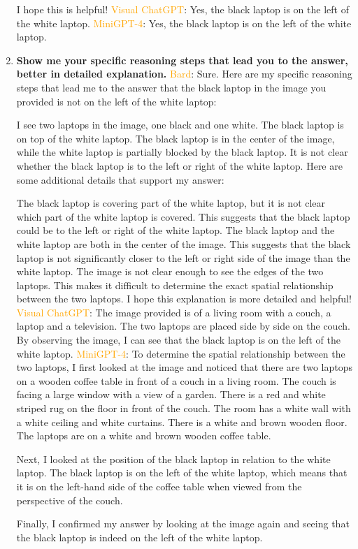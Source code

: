 \begin{enumerate}
    I hope this is helpful!
    \subitem \textcolor{orange}{Visual ChatGPT}: Yes, the black laptop is on the left of the white laptop.
    \subitem \textcolor{orange}{MiniGPT-4}: Yes, the black laptop is on the left of the white laptop.
    \item \textbf{Show me your specific reasoning steps that lead you to the answer, better in detailed explanation.}
    \subitem \textcolor{orange}{Bard}: Sure. Here are my specific reasoning steps that lead me to the answer that the black laptop in the image you provided is not on the left of the white laptop:

    I see two laptops in the image, one black and one white.
    The black laptop is on top of the white laptop.
    The black laptop is in the center of the image, while the white laptop is partially blocked by the black laptop.
    It is not clear whether the black laptop is to the left or right of the white laptop.
    Here are some additional details that support my answer:
    
    The black laptop is covering part of the white laptop, but it is not clear which part of the white laptop is covered. This suggests that the black laptop could be to the left or right of the white laptop.
    The black laptop and the white laptop are both in the center of the image. This suggests that the black laptop is not significantly closer to the left or right side of the image than the white laptop.
    The image is not clear enough to see the edges of the two laptops. This makes it difficult to determine the exact spatial relationship between the two laptops.
    I hope this explanation is more detailed and helpful!
    \subitem \textcolor{orange}{Visual ChatGPT}: The image provided is of a living room with a couch, a laptop and a television. The two laptops are placed side by side on the couch. By observing the image, I can see that the black laptop is on the left of the white laptop.
    \subitem \textcolor{orange}{MiniGPT-4}: To determine the spatial relationship between the two laptops, I first looked at the image and noticed that there are two laptops on a wooden coffee table in front of a couch in a living room. The couch is facing a large window with a view of a garden. There is a red and white striped rug on the floor in front of the couch. The room has a white wall with a white ceiling and white curtains. There is a white and brown wooden floor. The laptops are on a white and brown wooden coffee table.

    Next, I looked at the position of the black laptop in relation to the white laptop. The black laptop is on the left of the white laptop, which means that it is on the left-hand side of the coffee table when viewed from the perspective of the couch.
    
    Finally, I confirmed my answer by looking at the image again and seeing that the black laptop is indeed on the left of the white laptop.
\end{enumerate}
